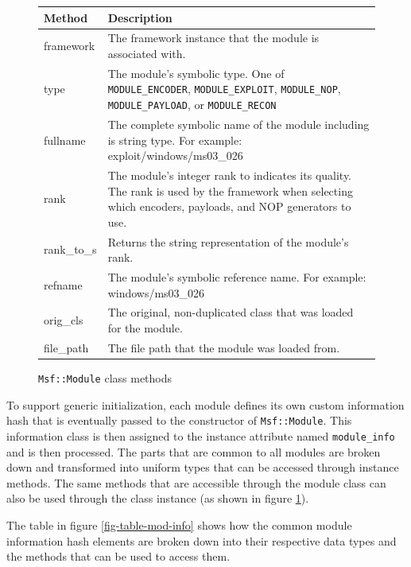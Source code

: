 \documentclass{report}
\begin{document}
\begin{figure}[h]
\begin{center}
\begin{tabular}{|l|p{3.5in}|}
\hline
\textbf{Method} & \textbf{Description} \\
\hline
framework & The framework instance that the module is associated with. \\
\hline
type & The module's symbolic type.  One of \texttt{MODULE\_ENCODER}, \texttt{MODULE\_EXPLOIT}, \texttt{MODULE\_NOP}, \texttt{MODULE\_PAYLOAD}, or \texttt{MODULE\_RECON} \\
\hline
fullname & The complete symbolic name of the module including is string type.  For example: exploit/windows/ms03\_026 \\
\hline
rank & The module's integer rank to indicates its quality.  The rank is used by the framework when selecting which encoders, payloads, and NOP generators to use. \\
\hline
rank\_to\_s & Returns the string representation of the module's rank. \\
\hline
refname & The module's symbolic reference name.  For example: windows/ms03\_026 \\
\hline
orig\_cls & The original, non-duplicated class that was loaded for the module. \\
\hline
file\_path & The file path that the module was loaded from. \\
\hline
\end{tabular}
\caption{\texttt{Msf::Module} class methods}
\label{fig-table-mod-class-methods}
\end{center}
\end{figure}

\par
To support generic initialization, each module defines its own
custom information hash that is eventually passed to the constructor
of \texttt{Msf::Module}.  This information class is then assigned to
the instance attribute named \texttt{module\_info} and is then
processed. The parts that are common to all modules are broken down
and transformed into uniform types that can be accessed through
instance methods. The same methods that are accessible through the
module class can also be used through the class instance (as shown
in figure \ref{fig-table-mod-class-methods}).

\par
The table in figure \ref{fig-table-mod-info} shows how the common
module information hash elements are broken down into their
respective data types and the methods that can be used to access
them.
\end{document}
